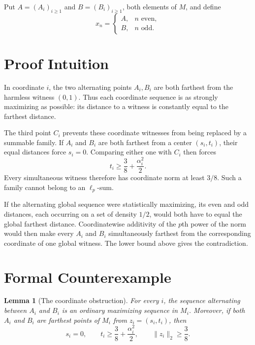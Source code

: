 \documentclass[11pt]{article}
\newtheorem{lemma}{Lemma}
\begin{document}
Put $A=(A_i)_{i\geq1}$ and $B=(B_i)_{i\geq1}$, both elements of $M$, and
define
\[
 x_n=\begin{cases}
 A,&n\text{ even},\\
 B,&n\text{ odd}.
 \end{cases}
\]

\section*{Proof Intuition}

In coordinate $i$, the two alternating points $A_i,B_i$ are both farthest
from the harmless witness $(0,1)$.  Thus each coordinate sequence is as
strongly maximizing as possible: its distance to a witness is constantly
equal to the farthest distance.

The third point $C_i$ prevents these coordinate witnesses from being replaced
by a summable family.  If $A_i$ and $B_i$ are both farthest from a center
$(s_i,t_i)$, their equal distances force $s_i=0$.  Comparing either one with
$C_i$ then forces
\[
 t_i\geq\frac38+\frac{\alpha_i^2}{2}.
\]
Every simultaneous witness therefore has coordinate norm at least $3/8$.
Such a family cannot belong to an $\ell_p$-sum.

If the alternating global sequence were statistically maximizing, its even
and odd distances, each occurring on a set of density $1/2$, would both have
to equal the global farthest distance.  Coordinatewise additivity of the
$p$th power of the norm would then make every $A_i$ and $B_i$ simultaneously
farthest from the corresponding coordinate of one global witness.  The lower
bound above gives the contradiction.

\section*{Formal Counterexample}

\begin{lemma}[The coordinate obstruction]
\label{lem:coordinate}
For every $i$, the sequence alternating between $A_i$ and $B_i$ is an
ordinary maximizing sequence in $M_i$.  Moreover, if both $A_i$ and $B_i$
are farthest points of $M_i$ from $z_i=(s_i,t_i)$, then
\[
 s_i=0,
 \qquad
 t_i\geq\frac38+\frac{\alpha_i^2}{2},
 \qquad
 \|z_i\|_2\geq\frac38.
\]
\end{lemma}
\end{document}
